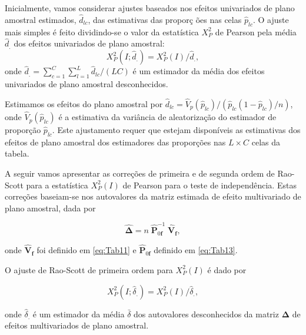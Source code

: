 \documentclass[]{book}
\numberwithin{example}{chapter}
\numberwithin{remark}{chapter}
\numberwithin{definition}{chapter}
\begin{document}
Inicialmente, vamos considerar ajustes baseados nos efeitos univariados
de plano amostral estimados, \(\hat{d}_{lc}\), das estimativas das
proporç ões nas celas \(\hat{p}_{lc}\). O ajuste mais simples é feito
dividindo-se o valor da estatística \(X_{P}^{2}\) de Pearson pela média
\(\hat{d}_{.}\) dos efeitos univariados de plano amostral: \[
X_{P}^{2}\left( I;\hat{d}_{.}\right) =X_{P}^{2}\left( I\right) /\hat{d}
_{.}, 
\] onde
\(\hat{d}_{.}=\sum_{c=1}^{C}\sum_{l=1}^{L}\hat{d}_{lc}/\left( LC\right)\)
é um estimador da média dos efeitos univariados de plano amostral
desconhecidos.

Estimamos os efeitos do plano amostral por
\(\hat{d}_{lc}=\hat{V}_{p}\left( \hat{p}_{lc}\right) /\)\linebreak \(\left( \hat{p}_{lc}\left( 1-\hat{p} _{lc}\right) /n\right)\),
onde \(\hat{V}_{p}\left( \hat{p}_{lc}\right)\) é a estimativa da
variância de aleatorização do estimador de proporção \(\hat{p}_{lc}\).
Este ajustamento requer que estejam disponíveis as estimativas dos
efeitos de plano amostral dos estimadores das proporções nas
\(L\times C\) celas da tabela.

A seguir vamos apresentar as correções de primeira e de segunda ordem de
Rao-Scott para a estatística \(X_{P}^{2}\left( I\right)\) de Pearson
para o teste de independência. Estas correções baseiam-se nos
autovalores da matriz estimada de efeito multivariado de plano amostral,
dada por

\begin{equation}
\mathbf{\hat{\Delta}}=n\;\mathbf{\hat{P}}_{0\mathbf{f}}^{-1}\;\mathbf{\hat{V}
}_{\mathbf{f}},  \label{eq:Tab14}
\end{equation}

onde \(\mathbf{\hat{V}}_{\mathbf{f}}\) foi definido em \eqref{eq:Tab11} e
\(\mathbf{ \hat{P}}_{0\mathbf{f}}\) definido em \eqref{eq:Tab13}.

O ajuste de Rao-Scott de primeira ordem para
\(X_{P}^{2}\left( I\right)\) é dado por

\begin{equation}
X_{P}^{2}\left( I;\hat{\delta}_{.}\right) =X_{P}^{2}\left( I\right) /\hat{
\delta}_{.},  \label{eq:Tab15}
\end{equation}

onde \(\hat{\delta}_{.}\) é um estimador da média \(\bar{\delta}\) dos
autovalores desconhecidos da matriz \(\mathbf{\Delta }\) de efeitos
multivariados de plano amostral.
\end{document}

